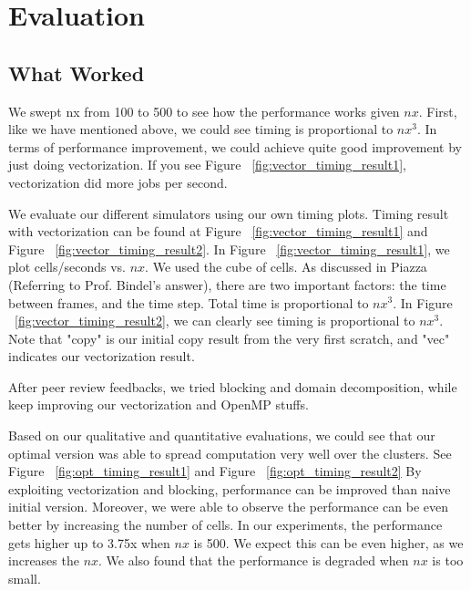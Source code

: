\section{Evaluation}\label{sec:evaluation}

\subsection{What Worked}
We swept nx from 100 to 500 to see how the performance works given $nx$. First, like we have mentioned above, we could see timing is proportional to $ nx^{3} $. In terms of performance improvement, we could achieve quite good improvement by just doing vectorization. If you see Figure ~\ref{fig:vector_timing_result1}, vectorization did more jobs per second. 

We evaluate our different simulators using our own timing plots. Timing result with vectorization can be found at Figure ~\ref{fig:vector_timing_result1} and Figure ~\ref{fig:vector_timing_result2}. In Figure ~\ref{fig:vector_timing_result1}, we plot cells/seconds vs. $nx$. We used the cube of cells. As discussed in Piazza (Referring to Prof. Bindel's answer), there are two important factors: the time between frames, and the time step. Total time is proportional to $ nx^{3} $. In Figure ~\ref{fig:vector_timing_result2}, we can clearly see timing is proportional to $ nx^{3} $. Note that "copy" is our initial copy result from the very first scratch, and "vec" indicates our vectorization result.

After peer review feedbacks, we tried blocking and domain decomposition, while keep improving our vectorization and OpenMP stuffs.

Based on our qualitative and quantitative evaluations, we could see that our optimal version was able to spread computation very well over the clusters. See Figure ~\ref{fig:opt_timing_result1} and Figure ~\ref{fig:opt_timing_result2} By exploiting vectorization and blocking, performance can be improved than naive initial version. Moreover, we were able to observe the performance can be even better by increasing the number of cells. In our experiments, the performance gets higher up to 3.75x when $ nx $ is 500. We expect this can be even higher, as we increases the $ nx $. We also found that the performance is degraded when $ nx $ is too small.  

